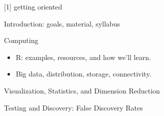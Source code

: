 \documentclass[11pt,xcolor=svgnames]{beamer}
\newcommand{\theme}{\color{Maroon}}
\newcommand{\bk}{\color{black}}
\newcommand{\sg}{\color{DarkSlateGray}}
\newcommand{\sk}{\vspace{.5cm}}
\begin{document}
\setcounter{page}{0}
{ 
 }


\begin{frame}
{[1] \theme  getting oriented}

\begin{adjustwidth}{.25in}{}
Introduction: \sg goals, material, syllabus\bk

\sk
Computing 
\begin{itemize} 
\item  {\bk R:} examples, resources, and how we'll learn.
\item  Big data, distribution, storage, connectivity.
\end{itemize}

\sk
Visualization, Statistics, and Dimension Reduction

\sk
Testing and Discovery: \sg False Discovery Rates

\end{adjustwidth}

\end{frame}
\end{document}
